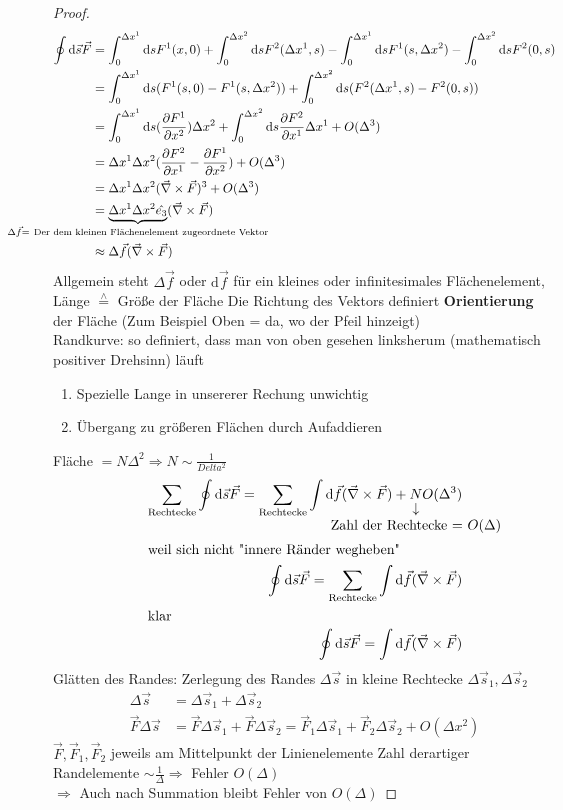 \documentclass[a4paper]{scrartcl}
\newcommand{\estimates}{\overset{\scriptscriptstyle\wedge}{=}}
\renewcommand{\d}{\mathrm{d}}
\renewcommand{\v}[1]{\vec{#1}}
\theoremstyle{definition}
\theoremstyle{plain}
\theoremstyle{remark}
\begin{document}
\begin{proof}
\begin{align*}
\oint \d\v s\v F &= \int_0^{\Delta x^1}\d s F^1(x,0) + \int_0^{\Delta x^2}\d s F^2(\Delta x^1, s) - \int_0^{\Delta x^1}\d s F^1(s, \Delta x^2) - \int_0^{\Delta x^2}\d s F^2(0,s) \\
&= \int_0^{\Delta x^1}\d s(F^1(s,0) - F^1(s,\Delta x^2)) + \int_0^{\Delta x^2}\d s(F^2(\Delta x^1, s) - F^2(0,s)) \\
&= \int_0^{\Delta x^1}\d s(\frac{\partial F^1}{\partial x^2})\Delta x^2 + \int_0^{\Delta x^2}\d s \frac{\partial F^2}{\partial x^1}\Delta x^1 + O(\Delta^3) \\
&= \Delta x^1 \Delta x^2(\frac{\partial F^2}{\partial x^1} - \frac{\partial F^1}{\partial x^2}) + O(\Delta^3) \\
&= \Delta x^1 \Delta x^2(\v\nabla \times \v F)^3 + O(\Delta^3) \\
&= \underbrace{\Delta x^1 \Delta x^2 \hat{e_3}}_{\mathclap{\Delta \v f = ~\text{Der dem kleinen Flächenelement zugeordnete Vektor}}} (\v\nabla \times \v F) \\
&\approx \Delta \v f(\v \nabla \times \v F)
\end{align*}
Allgemein steht $\Delta \v f$ oder $\d \v f$ für ein kleines oder infinitesimales Flächenelement, Länge $\estimates$ Größe der Fläche
Die Richtung des Vektors definiert \textbf{Orientierung} der Fläche (Zum Beispiel Oben = da, wo der Pfeil hinzeigt) \\
   Randkurve: so definiert, dass man von oben gesehen linksherum (mathematisch positiver Drehsinn) läuft
\begin{enumerate}
\item Spezielle Lange in unsererer Rechung unwichtig
\item Übergang zu größeren Flächen durch Aufaddieren
\end{enumerate}
Fläche $= N\Delta ^2 \Rightarrow N\sim \frac{1}{Delta^2}$
\begin{align*}
\sum_{\text{Rechtecke}} \oint\d \v s\v F = \sum_{\text{Rechtecke}} \int\d\v f(\v\nabla \times \v F) + \underarrow[N]{Zahl der Rechtecke = $O(\Delta)$} O(\Delta^3) \\
\shortintertext{weil sich nicht "innere Ränder wegheben"}
\oint\d \v s\v F = \sum_{\text{Rechtecke}} \int\d\v f(\v\nabla \times \v F) \\
\shortintertext{klar}
\oint\d \v s\v F = \int\d\v f(\v\nabla \times \v F) \\
\end{align*}
Glätten des Randes:
Zerlegung des Randes $\Delta \v s$ in kleine Rechtecke $\Delta \v s_1, \Delta \v s_2$
\begin{align*}
\Delta \v s &= \Delta \v s_1 + \Delta \v s_2 \\
\v F \Delta\v s &= \v F \Delta \v s_1 + \v F \Delta \v s_2 = \v F_1 \Delta \v s_1 + \v F_2 \Delta \v s_2 + O(\Delta x^2)
\end{align*}
$\v F, \v F_1, \v F_2$ jeweils am Mittelpunkt der Linienelemente
Zahl derartiger Randelemente $\sim \frac{1}{\Delta} \Rightarrow$ Fehler $O(\Delta)$ \\
   $\Rightarrow$ Auch nach Summation bleibt Fehler von $O(\Delta)$


\end{proof}
\end{document}
